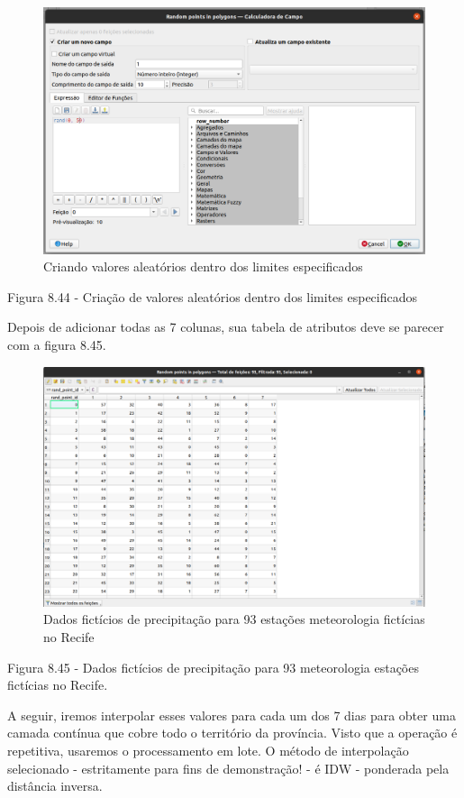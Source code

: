 \documentclass[
]{book}
\begin{document}
\begin{figure}
\centering
\includegraphics{media/modulo8/fig844.png}
\caption{Criando valores aleatórios dentro dos limites especificados}
\end{figure}

Figura 8.44 - Criação de valores aleatórios dentro dos limites especificados

Depois de adicionar todas as 7 colunas, sua tabela de atributos deve se parecer com a figura 8.45.

\begin{figure}
\centering
\includegraphics{media/modulo8/fig845.png}
\caption{Dados fictícios de precipitação para 93 estações meteorologia fictícias no Recife}
\end{figure}

Figura 8.45 - Dados fictícios de precipitação para 93 meteorologia estações fictícias no Recife.

A seguir, iremos interpolar esses valores para cada um dos 7 dias para obter uma camada contínua que cobre todo o território da província. Visto que a operação é repetitiva, usaremos o processamento em lote. O método de interpolação selecionado - estritamente para fins de demonstração! - é IDW - ponderada pela distância inversa.
\end{document}

